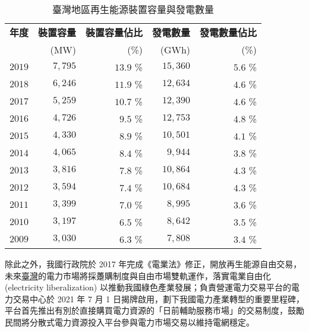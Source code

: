 \begin{table}[htp]
  \centering
  \caption[臺灣地區再生能源裝置容量與發電數量]{臺灣地區再生能源裝置容量與發電數量 \cite{boe2021data}}
  \begin{tabular}{crrrr}
    \toprule
    \textbf{年度} & \textbf{裝置容量} & \textbf{裝置容量佔比} & \textbf{發電數量} & \textbf{發電數量佔比} \\
                  & (\si{\MW})        & (\%)                  & (\si{GWh})        & (\%)                  \\
    \midrule
    $2019$        & $7,795$           & $13.9$ \%             & $15,360$          & $5.6$ \%              \\
    $2018$        & $6,246$           & $11.9$ \%             & $12,634$          & $4.6$ \%              \\
    $2017$        & $5,259$           & $10.7$ \%             & $12,390$          & $4.6$ \%              \\
    $2016$        & $4,726$           & $ 9.5$ \%             & $12,753$          & $4.8$ \%              \\
    $2015$        & $4,330$           & $ 8.9$ \%             & $10,501$          & $4.1$ \%              \\
    $2014$        & $4,065$           & $ 8.4$ \%             & $ 9,944$          & $3.8$ \%              \\
    $2013$        & $3,816$           & $ 7.8$ \%             & $10,864$          & $4.3$ \%              \\
    $2012$        & $3,594$           & $ 7.4$ \%             & $10,684$          & $4.3$ \%              \\
    $2011$        & $3,399$           & $ 7.0$ \%             & $ 8,995$          & $3.6$ \%              \\
    $2010$        & $3,197$           & $ 6.5$ \%             & $ 8,642$          & $3.5$ \%              \\
    $2009$        & $3,030$           & $ 6.3$ \%             & $ 7,808$          & $3.4$ \%              \\
    \bottomrule
  \end{tabular}
  \label{table: Renewable Energy Device Ratio in Taiwan}
\end{table}

除此之外，我國行政院於 2017 年完成《電業法》修正，開放再生能源自由交易，未來\uline{臺灣}的電力市場將採躉購制度與自由市場雙軌運作，落實電業自由化 (electricity liberalization) 以推動我國綠色產業發展；負責營運電力交易平台的電力交易中心於 2021 年 7 月 1 日揭牌啟用，劃下我國電力產業轉型的重要里程碑，平台首先推出有別於直接購買電力資源的「日前輔助服務市場」的交易制度，鼓勵民間將分散式電力資源投入平台參與電力市場交易以維持電網穩定。

